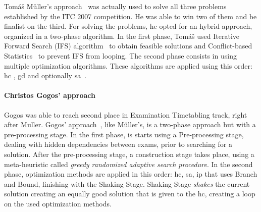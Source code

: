 Tom\'{a}\v{s} M\"{u}ller's approach~\cite{Mueller2009} was actually used to solve all three problems established by the ITC 2007 competition. He was able to win two of them and be finalist on the third. For solving the problems, he opted for an hybrid approach, organized in a two-phase algorithm. In the first phase, Tom\'{a}\v{s} used Iterative Forward Search (IFS) algorithm~\cite{Mueller2005} to obtain feasible solutions and Conflict-based Statistics~\cite{Mueller2004} to prevent IFS from looping. 
The second phase consists in using multiple optimization algorithms. These algorithms are applied using this order: \gls{hc} \cite{Russell2010}, \gls{gd} \cite{Dueck1993} and optionally \gls{sa}~\cite{Kirkpatrick1983}.\\


\paragraph{Christos Gogos' approach}

Gogos was able to reach second place in Examination Timetabling track, right after Muller. Gogos' approach~\cite{Gogos2012}, like M\"{u}ller's, is a two-phase approach but with a pre-processing stage. In the first phase, is starts using a Pre-processing stage, dealing with hidden dependencies between exams, prior to searching for a solution. After the pre-processing stage, a construction stage takes place, using a meta-heuristic called \textit{greedy randomized adaptive search procedure}. In the second phase, optimization methods are applied in this order: \gls{hc}, \gls{sa}, \gls{ip} that uses Branch and Bound, finishing with the Shaking Stage. Shaking Stage \textit{shakes} the current solution creating an equally good solution that is given to the \gls{hc}, creating a loop on the used optimization methods.\\

